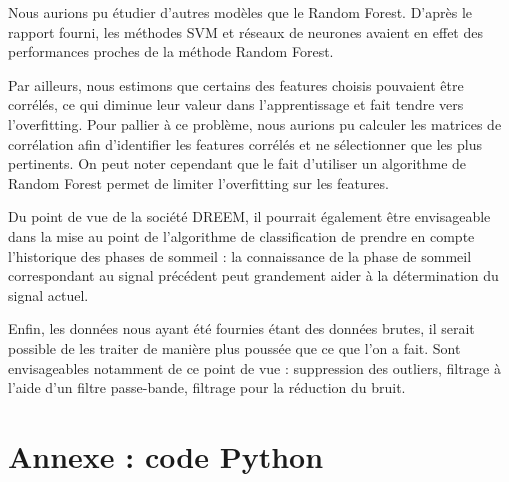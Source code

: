 \documentclass{article}
\begin{document}
\vspace{\baselineskip}

Nous aurions pu étudier d'autres modèles que le Random Forest. D'après le rapport fourni, les méthodes SVM et réseaux de neurones avaient en effet des performances proches de la méthode Random Forest.

\vspace{\baselineskip}

Par ailleurs, nous estimons que certains des features choisis pouvaient être corrélés, ce qui diminue leur valeur dans l'apprentissage et fait tendre vers l'overfitting. Pour pallier à ce problème, nous aurions pu calculer les matrices de corrélation afin d'identifier les features corrélés et ne sélectionner que les plus pertinents. On peut noter cependant que le fait d'utiliser un algorithme de Random Forest permet de limiter l'overfitting sur les features.

\vspace{\baselineskip}

Du point de vue de la société DREEM, il pourrait également être envisageable dans la mise au point de l'algorithme de classification de prendre en compte l'historique des phases de sommeil : la connaissance de la phase de sommeil correspondant au signal précédent peut grandement aider à la détermination du signal actuel.

\vspace{\baselineskip}

Enfin, les données nous ayant été fournies étant des données brutes, il serait possible de les traiter de manière plus poussée que ce que l'on a fait. Sont envisageables notamment de ce point de vue : suppression des outliers, filtrage à l'aide d'un filtre passe-bande, filtrage pour la réduction du bruit.


\newpage
\section{\hspace{0.3cm} Annexe : code Python}
\end{document}
